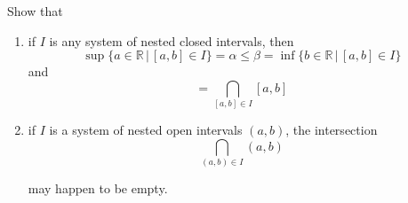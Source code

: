   \begin{exercise}[Zorich 2.3.1]
    Show that 
    \begin{enumerate}
      \item if $I$ is any system of nested closed intervals, then 
      \begin{equation}
        \sup\{ a \in \mathbb{R}\,|\, [a, b] \in I\} = \alpha \leq \beta = \inf\{ b \in \mathbb{R}\,|\,[a, b] \in I\}
      \end{equation}
      and 
      \begin{equation}
        [\alpha, \beta] = \bigcap_{[a, b] \in I} [a, b]
      \end{equation}
      \item if $I$ is a system of nested open intervals $(a, b)$, the intersection
      \begin{equation}
        \bigcap_{(a, b) \in I} (a, b)
      \end{equation}
       
      may happen to be empty. 
    \end{enumerate}
  \end{exercise}
